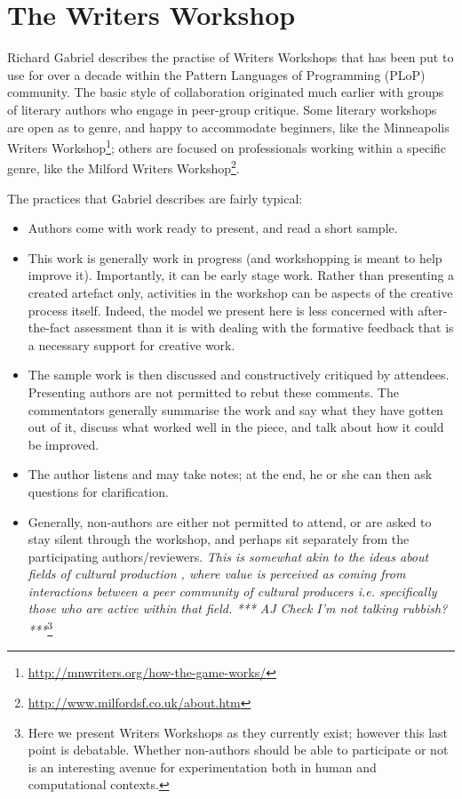 \section{The Writers Workshop} \label{sec:writers-workshop}

Richard Gabriel \citeyear{gabriel2002writer} describes the practise of
Writers Workshops that has been put to use for over a decade within
the Pattern Languages of Programming (PLoP) community.  The basic
style of collaboration originated much earlier with groups of literary
authors who engage in peer-group critique.  Some literary workshops
are open as to genre, and happy to accommodate beginners, like the
Minneapolis Writers
Workshop\footnote{\url{http://mnwriters.org/how-the-game-works/}};
others are focused on professionals working within a specific genre,
like the Milford Writers
Workshop\footnote{\url{http://www.milfordsf.co.uk/about.htm}}.  

The
practices that Gabriel describes are fairly typical:  
\begin{itemize}
\item Authors come with work ready to present, and read a short
  sample.
\item This work is generally work in progress (and workshopping is
  meant to help improve it).  Importantly, it can be early stage work.
  Rather than presenting a created artefact only, activities in the
  workshop can be aspects of the creative process itself.  Indeed, the
  model we present here is less concerned with after-the-fact
  assessment than it is with dealing with the formative feedback that
  is a necessary support for creative work.
\item The sample work is then
discussed and constructively critiqued by attendees.  Presenting
authors are not permitted to rebut these comments.  The commentators
generally summarise the work and say what they have gotten out of it,
discuss what worked well in the piece, and talk about how it could be
improved.  
\item The author listens and may take notes; at the end, he or
she can then ask questions for clarification.  
\item Generally, non-authors
are either not permitted to attend, or are asked to stay silent
through the workshop, and perhaps sit separately from the
participating authors/reviewers. {\em This is somewhat akin to the ideas about fields of cultural production \cite{bourdieu93}, where value is perceived as coming from interactions between a peer community of cultural producers i.e. specifically those who are active within that field. *** AJ Check I'm not talking rubbish? ***}\footnote{Here we present Writers Workshops as they currently exist; however this last point is debatable. Whether non-authors should be able to participate or not is an interesting avenue for experimentation both in human and computational contexts.}
\end{itemize}

